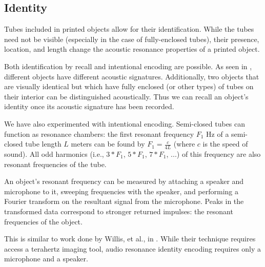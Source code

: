 \subsection{Identity}

Tubes included in printed objects allow for their identification.  While the tubes need not be visible (especially in the case of fully-enclosed tubes), their presence, location, and length change the acoustic resonance properties of a printed object.

Both identification by recall and intentional encoding are possible.  As seen in \cite{Ono-touchandactivate}, different objects have different acoustic signatures.  Additionally, two objects that are visually identical but which have fully enclosed (or other types) of tubes on their interior can be distinguished acoustically.  Thus we can recall an object's identity once its acoustic signature has been recorded.

We have also experimented with intentional encoding.  Semi-closed tubes can function as resonance chambers: the first resonant frequency $F_1$ Hz of a semi-closed tube length $L$ meters can be found by $F_1 = \frac{c}{4L}$ (where $c$ is the speed of sound).  All odd harmonics (i.e., $3*F_1$, $5*F_1$, $7*F_1$, ...) of this frequency are also resonant frequencies of the tube. 

An object's resonant frequency can be measured by attaching a speaker and microphone to it, sweeping frequencies with the speaker, and performing a Fourier transform on the resultant signal from the microphone.  Peaks in the transformed data correspond to stronger returned impulses: the resonant frequencies of the object.

This is similar to work done by Willis, et al., in \cite{Willis-infrastructs}.  While their technique requires access a terahertz imaging tool, audio resonance identity encoding requires only a microphone and a speaker.

